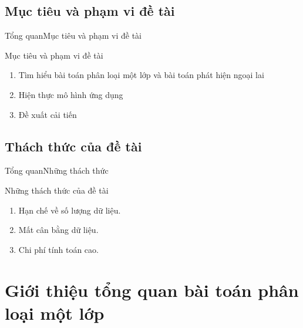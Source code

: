 \documentclass[
	10pt,                %
	aspectratio=169,     %
]{beamer}
\begin{document}
	
\subsection[Mục tiêu và phạm vi]{Mục tiêu và phạm vi đề tài}
	\begin{frame}{Tổng quan}{Mục tiêu và phạm vi đề tài}
		\begin{block}{Mục tiêu và phạm vi đề tài}
			\begin{enumerate}
				\item Tìm hiểu bài toán phân loại một lớp và bài toán phát hiện ngoại lai
				\item Hiện thực mô hình ứng dụng
				\item Đề xuất cải tiến
			\end{enumerate}
		\end{block}
	\end{frame}
	
\subsection[Thách thức]{Thách thức của đề tài}
	\begin{frame}{Tổng quan}{Những thách thức}
		\begin{block}{Những thách thức của đề tài}
			\begin{enumerate}
				\item Hạn chế về số lượng dữ liệu.
				\item Mất cân bằng dữ liệu.
				\item Chi phí tính toán cao.
			\end{enumerate}
		\end{block}
	\end{frame}

\section{Giới thiệu tổng quan bài toán phân loại một lớp}
\end{document}
